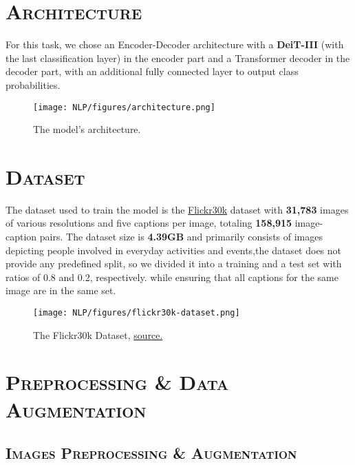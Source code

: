 \documentclass[a4paper,10pt]{article}
\begin{document}
\newpage
\section{\scshape{Architecture}}

\noindent For this task, we chose an Encoder-Decoder architecture with a \textbf{DeiT-III} (with the last classification layer) in the encoder part and a Transformer decoder in the decoder part, with an additional fully connected layer to output class probabilities.

\begin{figure}[H]
    \centering
    \texttt{[image: NLP/figures/architecture.png]}
    \caption{The model's architecture.}
\end{figure}

\section{\scshape{Dataset}}

\noindent The dataset used to train the model is the \textcolor{blue}{\href{https://www.kaggle.com/datasets/eeshawn/flickr30k}{Flickr30k}} dataset with \textbf{31,783} images of various resolutions and five captions per image, totaling \textbf{158,915} image-caption pairs. The dataset size is \textbf{4.39GB} and primarily consists of images depicting people involved in everyday activities and events,the dataset does not provide any predefined split, so we divided it into a training and a test set with ratios of 0.8 and 0.2, respectively. while ensuring that all captions for the same image are in the same set.\\

\begin{figure}[H]
    \centering
    \texttt{[image: NLP/figures/flickr30k-dataset.png]}
    \caption{The Flickr30k Dataset, \textcolor{blue}{\href{https://datasets.activeloop.ai/docs/ml/datasets/flickr30k-dataset/}{source.}}}
    \label{fig:enter-label}
\end{figure}

\newpage

\section{\scshape{Preprocessing \& Data Augmentation}}

\subsection{\scshape{Images Preprocessing \& Augmentation}}
\end{document}

